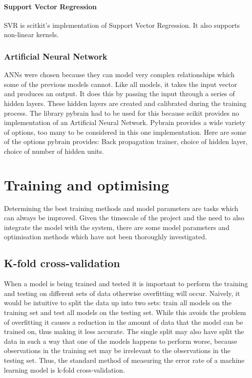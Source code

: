 \paragraph*{Support Vector Regression}
SVR is scitkit's implementation of Support Vector Regression. It also supports non-linear kernels.

\subsubsection{Artificial Neural Network}
ANNs were chosen because they can model very complex relationships which some of the previous models cannot. Like all models, it takes the input vector and produces an output. It does this by passing the input through a series of hidden layers. These hidden layers are created and calibrated during the training process. The library pybrain\cite{pybrain2010jmlr} had to be used for this because scikit provides no implementation of an Artificial Neural Network.
Pybrain provides a wide variety of options, too many to be considered in this one implementation. Here are some of the options pybrain provides: Back propagation trainer, choice of hidden layer, choice of number of hidden units.

\section{Training and optimising}
Determining the best training methods and model parameters are tasks which can always be improved. Given the timescale of the project and the need to also integrate the model with the system, there are some model parameters and optimisation methods which have not been thoroughly investigated.

\subsection{K-fold cross-validation}
When a model is being trained and tested it is important to perform the training and testing on different sets of data otherwise overfitting will occur. Naively, it would be intuitive to split the data up into two sets: train all models on the training set and test all models on the testing set. While this avoids the problem of overfitting it causes a reduction in the amount of data that the model can be trained on, thus making it less accurate. The single split may also have split the data in such a way that one of the models happens to perform worse, because observations in the training set may be irrelevant to the observations in the testing set. Thus, the standard method of measuring the error rate of a machine learning model is k-fold cross-validation\cite{witten2011data}.

